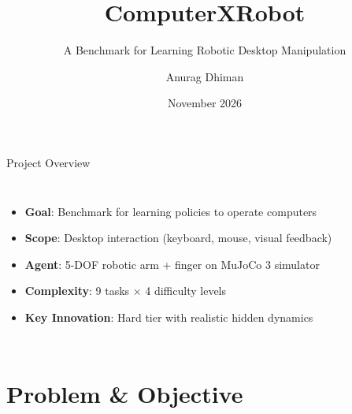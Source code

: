 \documentclass[10pt,aspectratio=16:9]{beamer}
\title{ComputerXRobot}
\subtitle{A Benchmark for Learning Robotic Desktop Manipulation}
\author{Anurag Dhiman}
\date{November 2026}
\begin{document}
\begin{frame}[plain]
  \titlepage
\end{frame}

\begin{frame}{Project Overview}
  \begin{columns}
    \begin{itemize}
      \item \textbf{Goal}: Benchmark for learning policies to operate computers
      \item \textbf{Scope}: Desktop interaction (keyboard, mouse, visual feedback)
      \item \textbf{Agent}: 5-DOF robotic arm + finger on MuJoCo 3 simulator
      \item \textbf{Complexity}: 9 tasks × 4 difficulty levels
      \item \textbf{Key Innovation}: Hard tier with realistic hidden dynamics
    \end{itemize}

    \begin{center}
      \vspace{0.5em}
    \end{center}
  \end{columns}
\end{frame}

\section{Problem \& Objective}
\end{document}
